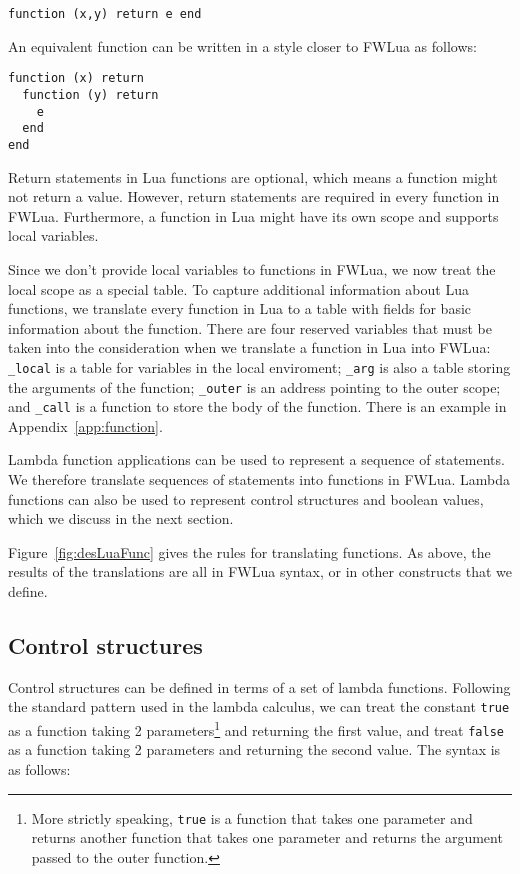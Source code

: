 \begin{verbatim}
function (x,y) return e end
\end{verbatim}

An equivalent function can be written in a style closer to FWLua as follows:

\begin{verbatim}
function (x) return 
  function (y) return 
    e
  end
end
\end{verbatim}


Return statements in Lua functions are optional, which means a function might not return a value. However, return statements are required in every function in FWLua.
Furthermore, a function in Lua might have its own scope and supports local variables. 

Since we don't provide local variables to functions in FWLua, we now treat the local scope as a special table.
To capture additional information about Lua functions,
we translate every function in Lua to a table with fields for basic information about the function. There are four reserved variables that must be taken into the consideration when we translate a function in Lua into FWLua: {\tt \_local} is a table for variables in the local enviroment; {\tt \_arg} is also a table storing the arguments of the function; {\tt \_outer} is an address pointing to the outer scope; and {\tt \_call} is a function to store the body of the function. There is an example in Appendix~\ref{app:function}.

Lambda function applications can be used to represent a sequence of  statements. We therefore translate sequences of statements into functions in FWLua. Lambda functions can also be used to represent control structures and boolean values, which we discuss in the next section.

Figure~\ref{fig:desLuaFunc} gives the rules for translating functions. As above, the results of the translations are all in FWLua syntax, or in other constructs that we define.

\subsection{Control structures}
Control structures can be defined in terms of a set of lambda functions. 
Following the standard pattern used in the lambda calculus,
we can treat the constant {\tt true} as a function taking 2 parameters\footnote{
  More strictly speaking, {\tt true} is a function that takes one parameter
  and returns another function that takes one parameter and returns
  the argument passed to the outer function.
}
and returning the first value, and treat {\tt false} as a function taking 2 parameters and returning the second value. The syntax is as follows:

